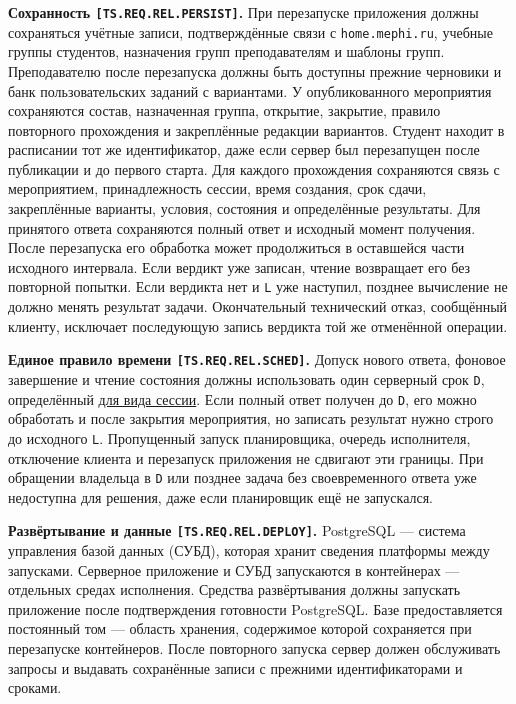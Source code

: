 \documentclass[12pt,a4paper]{article}
\begin{document}
\hypertarget{ts-req-rel-persist}{} \textbf{Сохранность \texttt{[TS.\allowbreak{}REQ.\allowbreak{}REL.\allowbreak{}PERSIST]}.} При перезапуске приложения должны сохраняться учётные записи, подтверждённые связи с \texttt{home.\allowbreak{}mephi.\allowbreak{}ru}, учебные группы студентов, назначения групп преподавателям и шаблоны групп. Преподавателю после перезапуска должны быть доступны прежние черновики и банк пользовательских заданий с вариантами. У опубликованного мероприятия сохраняются состав, назначенная группа, открытие, закрытие, правило повторного прохождения и закреплённые редакции вариантов. Студент находит в расписании тот же идентификатор, даже если сервер был перезапущен после публикации и до первого старта. Для каждого прохождения сохраняются связь с мероприятием, принадлежность сессии, время создания, срок сдачи, закреплённые варианты, условия, состояния и определённые результаты. Для принятого ответа сохраняются полный ответ и исходный момент получения. После перезапуска его обработка может продолжиться в оставшейся части исходного интервала. Если вердикт уже записан, чтение возвращает его без повторной попытки. Если вердикта нет и \texttt{L} уже наступил, позднее вычисление не должно менять результат задачи. Окончательный технический отказ, сообщённый клиенту, исключает последующую запись вердикта той же отменённой операции.

\hypertarget{ts-req-rel-sched}{} \textbf{Единое правило времени \texttt{[TS.\allowbreak{}REQ.\allowbreak{}REL.\allowbreak{}SCHED]}.} Допуск нового ответа, фоновое завершение и чтение состояния должны использовать один серверный срок \texttt{D}, определённый {\hyperlink{ts-req-func-session-time}{для вида сессии}}. Если полный ответ получен до \texttt{D}, его можно обработать и после закрытия мероприятия, но записать результат нужно строго до исходного \texttt{L}. Пропущенный запуск планировщика, очередь исполнителя, отключение клиента и перезапуск приложения не сдвигают эти границы. При обращении владельца в \texttt{D} или позднее задача без своевременного ответа уже недоступна для решения, даже если планировщик ещё не запускался.

\hypertarget{ts-req-rel-deploy}{} \textbf{Развёртывание и данные \texttt{[TS.\allowbreak{}REQ.\allowbreak{}REL.\allowbreak{}DEPLOY]}.} PostgreSQL --- система управления базой данных (СУБД), которая хранит сведения платформы между запусками. Серверное приложение и СУБД запускаются в контейнерах --- отдельных средах исполнения. Средства развёртывания должны запускать приложение после подтверждения готовности PostgreSQL. Базе предоставляется постоянный том --- область хранения, содержимое которой сохраняется при перезапуске контейнеров. После повторного запуска сервер должен обслуживать запросы и выдавать сохранённые записи с прежними идентификаторами и сроками.
\end{document}
